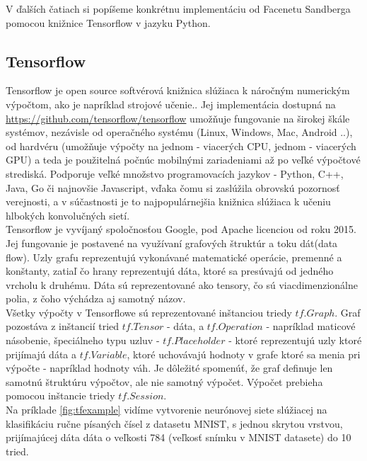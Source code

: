 \indent V ďalších čatiach si popíšeme konkrétnu implementáciu od Facenetu Sandberga \cite{davidsan26} pomocou knižnice Tensorflow v jazyku Python.

\subsection{Tensorflow}
Tensorflow je open source softvérová knižnica slúžiaca k náročným numerickým výpočtom, ako je napríklad strojové učenie.\cite{tensorflow2015}.
Jej implementácia dostupná na \url{https://github.com/tensorflow/tensorflow} umožňuje fungovanie na širokej škále systémov, nezávisle od operačného systému (Linux, Windows, Mac, Android ..), od hardvéru (umožňuje výpočty na jednom - viacerých CPU, jednom - viacerých GPU) a teda je použitelná počnúc mobilnými zariadeniami až po veľké výpočtové strediská.
Podporuje veľké množstvo programovacích jazykov - Python, C++, Java, Go či najnovšie Javascript, vďaka čomu si zaslúžila obrovskú pozornosť verejnosti, a v súčastnosti je to najpopulárnejšia knižnica slúžiaca k učeniu hlbokých konvolučných sietí.\\

\indent Tensorflow je vyvíjaný spoločnosťou Google, pod Apache licenciou od roku 2015\cite{tensorflow2015}.
Jej fungovanie je postavené na využívaní grafových štruktúr a toku dát(data flow).
Uzly grafu reprezentujú vykonávané matematické operácie, premenné a konštanty, zatiaľ čo hrany reprezentujú dáta, ktoré sa presúvajú od jedného vrcholu k druhému.
Dáta sú reprezentované ako tensory, čo sú viacdimenzionálne polia, z čoho výchádza aj samotný názov. \\

\indent Všetky výpočty v Tensorflowe sú reprezentované inštanciou triedy $ tf.Graph $. \cite{TensorFl6}
Graf pozostáva z inštancií tried $ tf.Tensor $ - dáta, a $ tf.Operation $ - napríklad maticové násobenie, špeciálneho typu uzluv - $ tf.Placeholder $ - ktoré reprezentujú uzly ktoré prijímajú dáta a $ tf.Variable $, ktoré uchovávajú hodnoty v grafe ktoré sa menia pri výpočte - napríklad hodnoty váh.
Je dôležité spomenúť, že graf definuje len samotnú štruktúru výpočtov, ale nie samotný výpočet.
Výpočet prebieha pomocou inštancie triedy $ tf.Session $. \\

\indent Na príklade \ref{fig:tfexample} vidíme vytvorenie neurónovej siete slúžiacej na klasifikáciu ručne písaných čísel z datasetu MNIST, s jednou skrytou vrstvou, prijímajúcej dáta dáta o veľkosti 784 (veľkosť snímku v MNIST datasete) do 10 tried.


